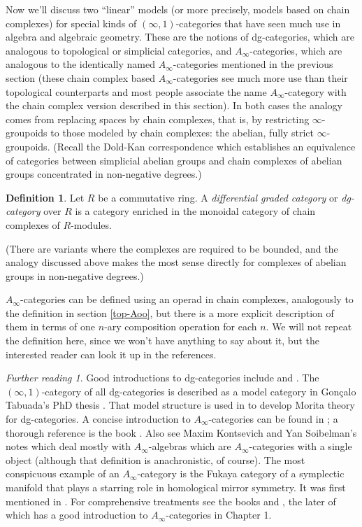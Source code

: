 \documentclass[12pt]{amsart}
\theoremstyle{definition} \newtheorem{definition}[theorem]{Definition}
\theoremstyle{remark} \newtheorem{remark}[theorem]{Remark}
\newtheorem*{further}{Further reading}
\numberwithin{equation}{section}
\newcommand{\oo}{\infty}
\newcommand{\io}{$(\oo,1)$}
\begin{document}
Now we'll discuss two ``linear'' models (or more precisely, models
based on chain complexes) for special kinds of \io-categories that
have seen much use in algebra and algebraic geometry. These are the
notions of dg-categories, which are analogous to topological or
simplicial categories, and $A_\oo$-categories, which are analogous to
the identically named $A_\oo$-categories mentioned in the previous
section (these chain complex based $A_\oo$-categories see much more
use than their topological counterparts and most people associate the
name $A_\oo$-category with the chain complex version described in this
section). In both cases the analogy comes from replacing spaces by
chain complexes, that is, by restricting $\oo$-groupoids to those
modeled by chain complexes: the abelian, fully strict $\oo$-groupoids.
(Recall the Dold-Kan correspondence which establishes an equivalence
of categories between simplicial abelian groups and chain complexes of
abelian groups concentrated in non-negative degrees.)

\begin{definition} Let $R$ be a commutative ring. A \emph{differential
graded category} or \emph{dg-category} over $R$ is a category enriched
in the monoidal category of chain complexes of $R$-modules.
\end{definition}

(There are variants where the complexes are required to be bounded,
and the analogy discussed above makes the most sense directly for
complexes of abelian groups in non-negative degrees.)

$A_\oo$-categories can be defined using an operad in chain complexes,
analogously to the definition in section \ref{top-Aoo}, but there is a
more explicit description of them in terms of one $n$-ary composition
operation for each $n$. We will not repeat the definition here, since
we won't have anything to say about it, but the interested reader can
look it up in the references.

\begin{further} Good introductions to dg-categories include
\cite{Keller} and \cite{ToenDG}. The \io-category of all dg-categories
is described as a model category in Gon\c{c}alo Tabuada's PhD thesis
\cite{Tabuada}. That model structure is used in \cite{ToenMorita}
to develop Morita theory for dg-categories.
A concise introduction to $A_\oo$-categories can be
found in \cite{Keller}; a thorough reference is the book
\cite{Bespalov}. Also see Maxim Kontsevich and Yan Soibelman's notes
\cite{KontsevichSoibelman} which deal mostly with $A_\oo$-algebras
which are $A_\oo$-categories with a single object (although that
definition is anachronistic, of course). The most conspicuous example
of an $A_\oo$-category is the Fukaya category of a symplectic manifold
that plays a starring role in homological mirror symmetry. It was
first mentioned in \cite{Fukaya}. For comprehensive treatments see the
books \cite{FOOO} and \cite{Seidel}, the later of which has a good
introduction to $A_\oo$-categories in Chapter 1. \end{further}
\end{document}
